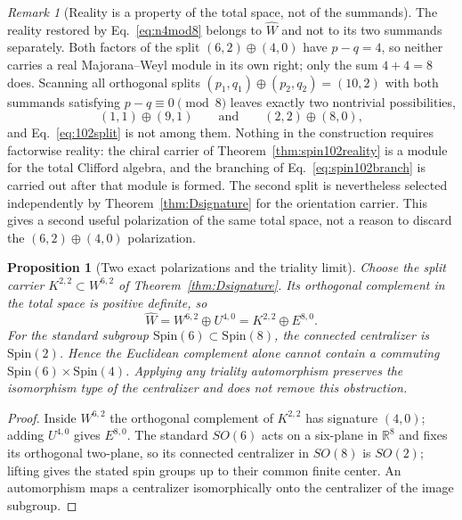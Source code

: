 \documentclass[11pt]{article}
\newtheorem{proposition}[theorem]{Proposition}
\theoremstyle{definition}\newtheorem{definition}[theorem]{Definition}
\theoremstyle{remark}\newtheorem{remark}[theorem]{Remark}\newtheorem{conjecture}[theorem]{Conjecture}
\begin{document}
\begin{remark}[Reality is a property of the total space, not of the summands]\label{rem:factorwisemw}
The reality restored by Eq.~\eqref{eq:n4mod8} belongs to $\widehat W$ and not to its two summands separately. Both factors of the split $(6,2)\oplus(4,0)$ have $p-q=4$, so neither carries a real Majorana--Weyl module in its own right; only the sum $4+4=8$ does. Scanning all orthogonal splits $(p_1,q_1)\oplus(p_2,q_2)=(10,2)$ with both summands satisfying $p-q\equiv0\pmod8$ leaves exactly two nontrivial possibilities,
\begin{equation}\label{eq:mwsplits}
 (1,1)\oplus(9,1)
 \qquad\text{and}\qquad
 (2,2)\oplus(8,0),
\end{equation}
and Eq.~\eqref{eq:102split} is not among them. Nothing in the construction requires factorwise reality: the chiral carrier of Theorem~\ref{thm:spin102reality} is a module for the total Clifford algebra, and the branching of Eq.~\eqref{eq:spin102branch} is carried out after that module is formed. The second split is nevertheless selected independently by Theorem~\ref{thm:Dsignature} for the orientation carrier. This gives a second useful polarization of the same total space, not a reason to discard the $(6,2)\oplus(4,0)$ polarization.
\end{remark}

\begin{proposition}[Two exact polarizations and the triality limit]\label{prop:twopolarizations}
Choose the split carrier $K^{2,2}\subset W^{6,2}$ of Theorem~\ref{thm:Dsignature}. Its orthogonal complement in the total space is positive definite, so
\begin{equation}\label{eq:twopolarizations}
 \boxed{
 \widehat W
 =W^{6,2}\oplus U^{4,0}
 =K^{2,2}\oplus E^{8,0}.}
\end{equation}
For the standard subgroup $\mathrm{Spin}(6)\subset\mathrm{Spin}(8)$, the connected centralizer is $\mathrm{Spin}(2)$. Hence the Euclidean complement alone cannot contain a commuting
$\mathrm{Spin}(6)\times\mathrm{Spin}(4)$. Applying any triality automorphism preserves the isomorphism type of the centralizer and does not remove this obstruction.
\end{proposition}
\begin{proof}
Inside $W^{6,2}$ the orthogonal complement of $K^{2,2}$ has signature $(4,0)$; adding $U^{4,0}$ gives $E^{8,0}$. The standard $SO(6)$ acts on a six-plane in $\mathbb R^8$ and fixes its orthogonal two-plane, so its connected centralizer in $SO(8)$ is $SO(2)$; lifting gives the stated spin groups up to their common finite center. An automorphism maps a centralizer isomorphically onto the centralizer of the image subgroup.
\end{proof}
\end{document}
